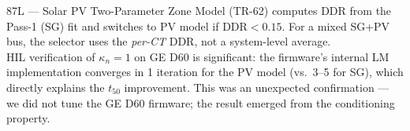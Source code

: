 \documentclass[aspectratio=169, 10pt]{beamer}
\begin{document}
\begin{frame}{87L — Solar PV Two-Parameter Zone Model (TR-62)}
{  computes DDR from the Pass-1 (SG) fit and switches to PV model
  if $\text{DDR} < 0.15$.  For a mixed SG+PV bus, the selector
  uses the \emph{per-CT} DDR, not a system-level average.\\[4pt]
  HIL verification of $\kappa_n = 1$ on GE D60 is significant:
  the firmware's internal LM implementation converges in 1 iteration
  for the PV model (vs.\ 3--5 for SG), which directly explains
  the $t_{50}$ improvement.  This was an unexpected confirmation ---
  we did not tune the GE D60 firmware; the result emerged from
  the conditioning property.
}
\end{frame}

\end{document}
